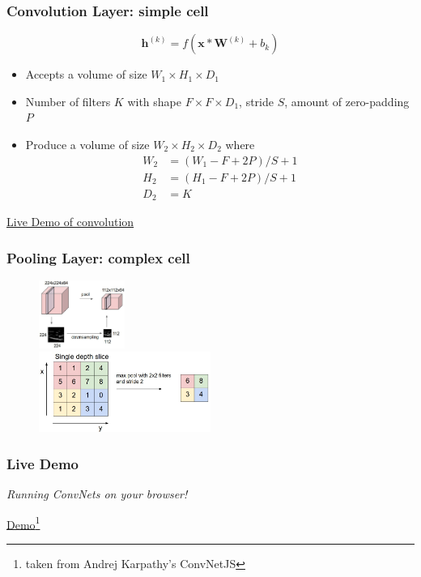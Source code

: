 \documentclass{beamer}
\begin{document}
\begin{frame}
  \frametitle{Convolution Layer: simple cell}

  \begin{equation*}
    \mathbf{h}^{(k)}=f(\mathbf{x}*\mathbf{W}^{(k)}+b_{k})
  \end{equation*}

  \begin{itemize}
    \item Accepts a volume of size $W_{1}\times H_{1}\times D_{1}$
    \item Number of filters $K$ with shape $F\times F\times D_{1}$, stride $S$, amount of zero-padding $P$
    \item Produce a volume of size $W_{2}\times H_{2}\times D_{2}$ where
      \begin{align*}
        W_{2}&=(W_{1}-F+2P)/S+1 \\
        H_{2}&=(H_{1}-F+2P)/S+1 \\
        D_{2}&=K
      \end{align*}
  \end{itemize}

  \href{http://rt.dgyblog.com/res/dlworkshop/conv_demo.html}{Live Demo of convolution}
\end{frame}

\begin{frame}
  \frametitle{Pooling Layer: complex cell}

  \begin{figure}
    \centering
    \includegraphics[width=0.25\textwidth]{pool.jpeg}\\
    \includegraphics[width=0.5\textwidth]{maxpool.jpeg}
  \end{figure}
\end{frame}

\begin{frame}
  \frametitle{Live Demo}

  \begin{center}
    \emph{Running ConvNets on your browser!}
    \vspace{1cm}
    
    \href{http://cs.stanford.edu/people/karpathy/convnetjs/demo/cifar10.html}{Demo}\footnote{taken from Andrej Karpathy's ConvNetJS}
  \end{center}
  
\end{frame}
\end{document}
